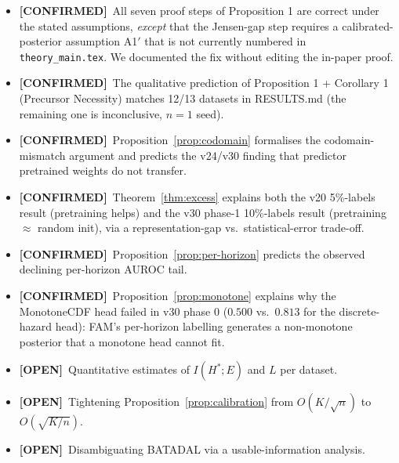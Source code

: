 \documentclass[11pt]{article}
\newcommand{\CONF}{{\color{black!60!green}\textbf{[CONFIRMED]}}}
\newcommand{\OPEN}{{\color{orange!80!black}\textbf{[OPEN]}}}
\begin{document}
\begin{itemize}[leftmargin=1.5em]
\item \CONF\ All seven proof steps of Proposition 1 are correct under
the stated assumptions, \emph{except} that the Jensen-gap step requires
a calibrated-posterior assumption A1$'$ that is not currently numbered in
\texttt{theory\_main.tex}. We documented the fix without editing the
in-paper proof.
\item \CONF\ The qualitative prediction of Proposition 1 + Corollary 1 (Precursor Necessity)
matches 12/13 datasets in RESULTS.md (the remaining one is
inconclusive, $n=1$ seed).
\item \CONF\ Proposition~\ref{prop:codomain} formalises the
codomain-mismatch argument and predicts the v24/v30 finding that
predictor pretrained weights do not transfer.
\item \CONF\ Theorem~\ref{thm:excess} explains both the v20 5\%-labels
result (pretraining helps) and the v30 phase-1 10\%-labels result
(pretraining $\approx$ random init), via a representation-gap vs.\
statistical-error trade-off.
\item \CONF\ Proposition~\ref{prop:per-horizon} predicts the observed
declining per-horizon AUROC tail.
\item \CONF\ Proposition~\ref{prop:monotone} explains why the MonotoneCDF
head failed in v30 phase 0 ($0.500$ vs.\ $0.813$ for the discrete-hazard
head): FAM's per-horizon labelling generates a non-monotone posterior
that a monotone head cannot fit.
\item \OPEN\ Quantitative estimates of $I(H^*;E)$ and $L$ per dataset.
\item \OPEN\ Tightening Proposition~\ref{prop:calibration} from
$O(K/\sqrt n)$ to $O(\sqrt{K/n})$.
\item \OPEN\ Disambiguating BATADAL via a usable-information analysis.
\end{itemize}
\end{document}
